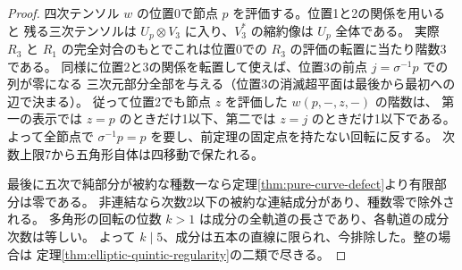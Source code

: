 \begin{proof}
四次テンソル $w$ の位置0で節点 $p$ を評価する。位置1と2の関係を用いると
残る三次テンソルは $U_p\otimes V_3$ に入り、$V_3^*$ の縮約像は $U_p$ 全体である。
実際 $R_3$ と $R_1$ の完全対合のもとでこれは位置0での $R_3$ の評価の転置に当たり階数3である。
同様に位置2と3の関係を転置して使えば、位置3の前点 $j=\sigma^{-1}p$ での列が零になる
三次元部分全部を与える（位置3の消滅超平面は最後から最初への辺で決まる）。
従って位置2でも節点 $z$ を評価した $w(p,-,z,-)$ の階数は、
第一の表示では $z=p$ のときだけ1以下、第二では $z=j$ のときだけ1以下である。
よって全節点で $\sigma^{-1}p=p$ を要し、前定理の固定点を持たない回転に反する。
次数上限7から五角形自体は四移動で保たれる。

最後に五次で純部分が被約な種数一なら定理\ref{thm:pure-curve-defect}より有限部分は零である。
非連結なら次数2以下の被約な連結成分があり、種数零で除外される。
多角形の回転の位数 $k>1$ は成分の全軌道の長さであり、各軌道の成分次数は等しい。
よって $k\mid 5$、成分は五本の直線に限られ、今排除した。整の場合は
定理\ref{thm:elliptic-quintic-regularity}の二類で尽きる。
\end{proof}
